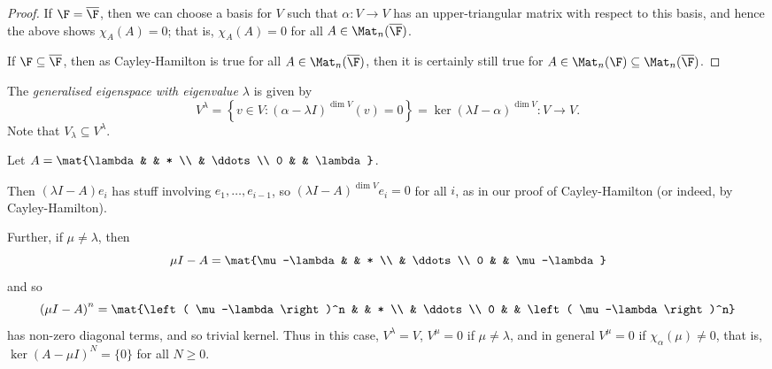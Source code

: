 \begin{proof}
	If $\F=\overline{\F}$, then we can choose a basis for $V$ such that $\alpha:V\to V$ has an upper-triangular matrix with respect to this basis, and hence the above shows $\chi_A(A)=0$; that is, $\chi_A(A)=0$ for all $A\in\Mat_n(\overline{\F})$.
	
	If $\F\subseteq\overline{\F}$, then as Cayley-Hamilton is true for all $A\in\Mat_n(\overline{\F})$, then it is certainly still true for $A\in\Mat_n(\F) \subseteq \Mat_n(\overline{\F})$.
\end{proof}

\begin{definition}
	The \emph{generalised eigenspace with eigenvalue $\lambda$} is given by
	\begin{equation*}
		  V^\lambda
		= \left\{v\in V : \left( \alpha-\lambda I \right)^{\dim V}(v)=0\right\}
		= \ker\left( \lambda I-\alpha \right)^{\dim V}
		: V \to V.
	\end{equation*}
	Note that $V_\lambda \subseteq V^\lambda$.
\end{definition}

\begin{example}
	Let $A=\mat{\lambda & & * \\ & \ddots \\ 0 & & \lambda}$.
	
	Then $\left( \lambda I-A \right)e_i$ has stuff involving $e_1,\ldots,e_{i-1}$, so $\left( \lambda I-A \right)^{\dim V} e_i=0$ for all $i$, as in our proof of Cayley-Hamilton (or indeed, by Cayley-Hamilton).
	
	Further, if $\mu\neq \lambda$, then
	\begin{equation*}
		\mu I-A = \mat{\mu-\lambda & & * \\ & \ddots \\ 0 & & \mu-\lambda}
	\end{equation*}
	and so
	\begin{equation*}
		\left( \mu I-A \right)^n = \mat{\left( \mu-\lambda \right)^n & & * \\ & \ddots \\ 0 & & \left( \mu-\lambda \right)^n}
	\end{equation*}
	has non-zero diagonal terms, and so trivial kernel. Thus in this case, $V^\lambda=V$, $V^\mu = 0$ if $\mu\neq \lambda$, and in general $V^\mu=0$ if $\chi_\alpha(\mu)\neq 0$, that is, $\ker\left( A-\mu I \right)^N = \{0\}$ for all $N\geq 0$.
\end{example}

	\pagebreak

